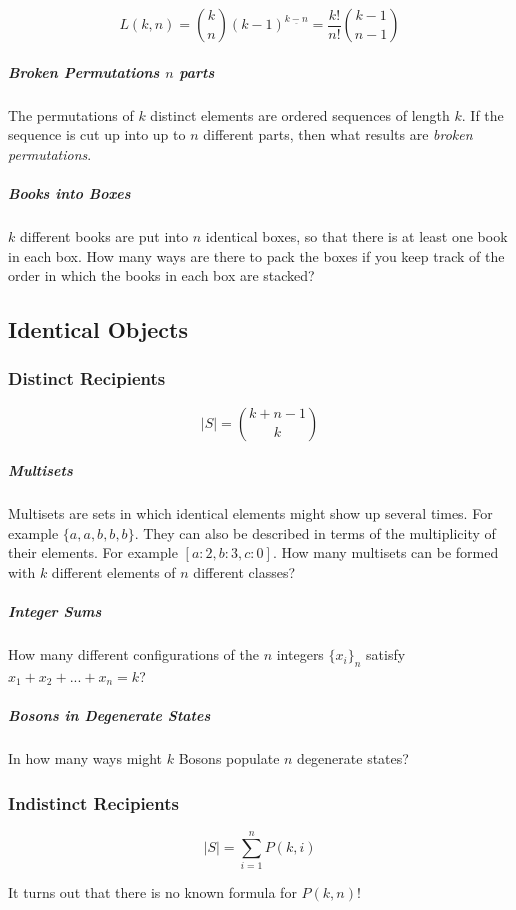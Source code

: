 \begin{equation}
L(k,n)= {k \choose n} (k-1)^{\underline{k-n}} = \frac{k!}{n!}{ k-1 \choose n-1 }
\end{equation}
	
	
\subparagraph{Broken Permutations $n$ parts} The permutations of $k$ distinct elements are ordered sequences of length $k$. If the sequence is cut up into up to $n$ different parts, then what results are \textit{broken permutations}.

\subparagraph{Books into Boxes} $k$ different books are put into $n$ identical boxes, so that there is at least one book in each box. How many ways are there to pack the boxes if you keep track of the order in which the books in each box are stacked? 


\subsection{Identical Objects}

\subsubsection{Distinct Recipients}

\begin{equation}
|S| = {k+n-1 \choose k}
\end{equation}

\subparagraph{Multisets} Multisets are sets in which identical elements might show up several times. For example $\{a,a,b,b,b\}$. They can also be described in terms of the multiplicity of their elements. For example $[a:2, b:3, c:0]$. How many multisets can be formed with $k$ different elements of $n$ different classes?

\subparagraph{Integer Sums} How many different configurations of the $n$ integers $\{ x_i\}_n$ satisfy $x_1 + x_2 + ... + x_n = k$?

\subparagraph{Bosons in Degenerate States} In how many ways might $k$ Bosons populate $n$ degenerate states?


\subsubsection{Indistinct Recipients}

\begin{equation}
|S| = \sum_{i=1}^n P(k,i)
\end{equation}

It turns out that there is no known formula for $P(k,n)$!

